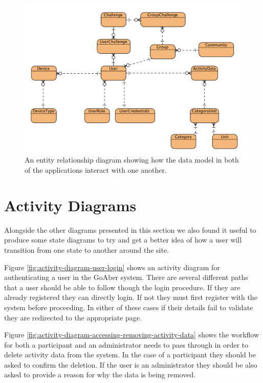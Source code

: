 \begin{figure}[H]
\centering
\includegraphics[width=1.0\textwidth]{../design/database/GoAber-ERD.png}
\caption{An entity relationship diagram showing how the data model in both of the applications interact with one another.}
\label{fig:database-design}
\end{figure}

\section{Activity Diagrams}
Alongside the other diagrams presented in this section we also found it useful to produce some state diagrams to try and get a better idea of how a user will transition from one state to another around the site.

Figure \ref{fig:activity-diagram-user-login} shows an activity diagram for authenticating a user in the GoAber system. There are several different paths that a user should be able to follow though the login procedure. If they are already registered they can directly login. If not they must first register with the system before proceeding. In either of these cases if their details fail to validate they are redirected to the appropriate page.

Figure \ref{fig:activity-diagram-accessing-removing-activity-data} shows the workflow for both a participant and an administrator needs to pass through in order to delete activity data from the system. In the case of a participant they should be asked to confirm the deletion. If the user is an administrator they should be also asked to provide a reason for why the data is being removed.

